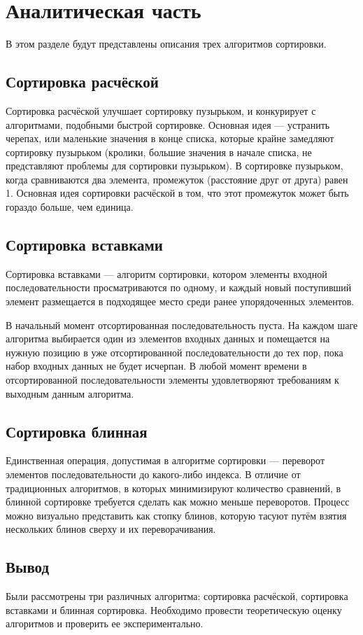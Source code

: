 \chapter{Аналитическая часть}

В этом разделе будут представлены описания трех алгоритмов сортировки.

\section{Сортировка расчёской}
Сортировка расчёской улучшает сортировку пузырьком, и конкурирует с алгоритмами, подобными быстрой сортировке.
Основная идея — устранить черепах, или маленькие значения в конце списка, которые крайне замедляют сортировку пузырьком (кролики, большие значения в начале списка, не представляют проблемы для сортировки пузырьком).
В сортировке пузырьком, когда сравниваются два элемента, промежуток (расстояние друг от друга) равен 1.
Основная идея сортировки расчёской в том, что этот промежуток может быть гораздо больше, чем единица.

\section{Сортировка вставками}
Сортировка вставками — алгоритм сортировки, котором элементы входной последовательности просматриваются по одному, и каждый новый поступивший элемент размещается в подходящее место среди ранее упорядоченных элементов.

В начальный момент отсортированная последовательность пуста.
На каждом шаге алгоритма выбирается один из элементов входных данных и помещается на нужную позицию в уже отсортированной последовательности до тех пор, пока набор входных данных не будет исчерпан.
В любой момент времени в отсортированной последовательности элементы удовлетворяют требованиям к выходным данным алгоритма.

\section{Сортировка блинная}
Единственная операция, допустимая в алгоритме сортировки — переворот элементов последовательности до какого-либо индекса.
В отличие от традиционных алгоритмов, в которых минимизируют количество сравнений, в блинной сортировке требуется сделать как можно меньше переворотов.
Процесс можно визуально представить как стопку блинов, которую тасуют путём взятия нескольких блинов сверху и их переворачивания.

\section*{Вывод}
Были рассмотрены три различных алгоритма: сортировка расчёской, сортировка вставками и блинная сортировка.
Необходимо провести теоретическую оценку алгоритмов и проверить ее экспериментально.
